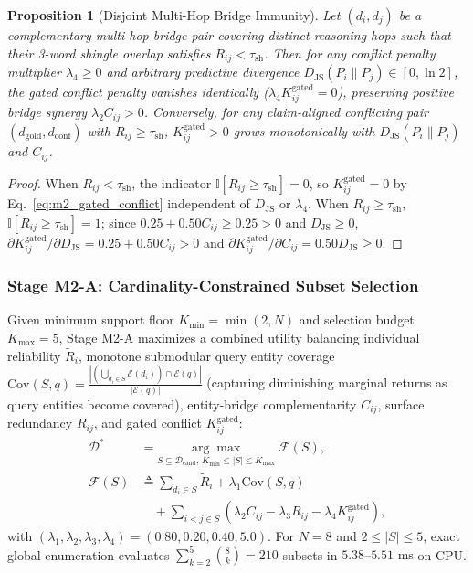 \documentclass[11pt]{article}
\newtheorem{proposition}{Proposition}
\begin{document}
\begin{proposition}[Disjoint Multi-Hop Bridge Immunity]
\label{prop:bridge_immunity}
Let $(d_i, d_j)$ be a complementary multi-hop bridge pair covering distinct reasoning hops such that their 3-word shingle overlap satisfies $R_{ij} < \tau_{\text{sh}}$. Then for any conflict penalty multiplier $\lambda_4 \ge 0$ and arbitrary predictive divergence $D_{\text{JS}}(P_i \parallel P_j) \in [0, \ln 2]$, the gated conflict penalty vanishes identically ($\lambda_4 K_{ij}^{\text{gated}} = 0$), preserving positive bridge synergy $\lambda_2 C_{ij} > 0$. Conversely, for any claim-aligned conflicting pair $(d_{\text{gold}}, d_{\text{conf}})$ with $R_{ij} \ge \tau_{\text{sh}}$, $K_{ij}^{\text{gated}} > 0$ grows monotonically with $D_{\text{JS}}(P_i \parallel P_j)$ and $C_{ij}$.
\end{proposition}
\begin{proof}
When $R_{ij} < \tau_{\text{sh}}$, the indicator $\mathbb{I}[R_{ij} \ge \tau_{\text{sh}}] = 0$, so $K_{ij}^{\text{gated}} = 0$ by Eq.~\eqref{eq:m2_gated_conflict} independent of $D_{\text{JS}}$ or $\lambda_4$. When $R_{ij} \ge \tau_{\text{sh}}$, $\mathbb{I}[R_{ij} \ge \tau_{\text{sh}}] = 1$; since $0.25 + 0.50 C_{ij} \ge 0.25 > 0$ and $D_{\text{JS}} \ge 0$, $\partial K_{ij}^{\text{gated}} / \partial D_{\text{JS}} = 0.25 + 0.50 C_{ij} > 0$ and $\partial K_{ij}^{\text{gated}} / \partial C_{ij} = 0.50 D_{\text{JS}} \ge 0$.
\end{proof}

\subsubsection{Stage M2-A: Cardinality-Constrained Subset Selection}
Given minimum support floor $K_{\min} = \min(2, N)$ and selection budget $K_{\max} = 5$, Stage M2-A maximizes a combined utility balancing individual reliability $\tilde{R}_i$, monotone submodular query entity coverage $\text{Cov}(S, q) = \frac{|(\bigcup_{d_i \in S}\mathcal{E}(d_i)) \cap \mathcal{E}(q)|}{|\mathcal{E}(q)|}$ (capturing diminishing marginal returns as query entities become covered), entity-bridge complementarity $C_{ij}$, surface redundancy $R_{ij}$, and gated conflict $K_{ij}^{\text{gated}}$:
\begin{align}
\mathcal{D}^* &= \underset{S \subseteq \mathcal{D}_{\text{cand}}, \, K_{\min} \le |S| \le K_{\max}}{\arg\max} \; \mathcal{F}(S), \label{eq:m2a_objective} \\
\mathcal{F}(S) &\triangleq \sum_{d_i \in S} \tilde{R}_i + \lambda_1 \text{Cov}(S, q) \nonumber \\
&\quad + \sum_{i < j \in S} (\lambda_2 C_{ij} - \lambda_3 R_{ij} - \lambda_4 K_{ij}^{\text{gated}}), \nonumber
\end{align}
with $(\lambda_1, \lambda_2, \lambda_3, \lambda_4) = (0.80, 0.20, 0.40, 5.0)$. For $N=8$ and $2 \le |S| \le 5$, exact global enumeration evaluates $\sum_{k=2}^5 \binom{8}{k} = 210$ subsets in $5.38\text{--}5.51\text{ ms}$ on CPU.
\end{document}
